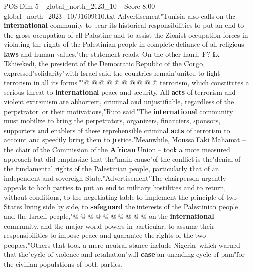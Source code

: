 \begin{textsample}{POS Dim 5 – global\_north\_2023\_10 – Score 8.00 – global\_north\_2023\_10/91609610.txt}
Advertisement"Tunisia also calls on the \textbf{international} community to bear its historical responsibilities to put an end to the gross occupation of all Palestine and to assist the Zionist occupation forces in violating the rights of the Palestinian people in complete defiance of all religious \textbf{laws} and human values,"the statement reads.
On the other hand, F? lix Tshisekedi, the president of the Democratic Republic of the Congo, expressed"solidarity"with Israel said the countries remain"united to fight terrorism in all its forms.""@ @ @ @ @ @ @ @ @ @ terrorism, which constitutes a serious threat to \textbf{international} peace and security.
All \textbf{acts} of terrorism and violent extremism are abhorrent, criminal and unjustifiable, regardless of the perpetrator, or their motivations,"Ruto said."The \textbf{international} community must mobilize to bring the perpetrators, organizers, financiers, sponsors, supporters and enablers of these reprehensible criminal \textbf{acts} of terrorism to account and speedily bring them to justice."Meanwhile, Moussa Faki Mahamat -- the chair of the Commission of the \textbf{African} Union -- took a more measured approach but did emphasize that the"main cause"of the conflict is the"denial of the fundamental rights of the Palestinian people, particularly that of an independent and sovereign State."Advertisement"The chairperson urgently appeals to both parties to put an end to military hostilities and to return, without conditions, to the negotiating table to implement the principle of two States living side by side, to \textbf{safeguard} the interests of the Palestinian people and the Israeli people,"@ @ @ @ @ @ @ @ @ @ on the \textbf{international} community, and the major world powers in particular, to assume their responsibilities to impose peace and guarantee the rights of the two peoples."Others that took a more neutral stance include Nigeria, which warned that the"cycle of violence and retaliation"will \textbf{case}"an unending cycle of pain"for the civilian populations of both parties.

\end{textsample}
